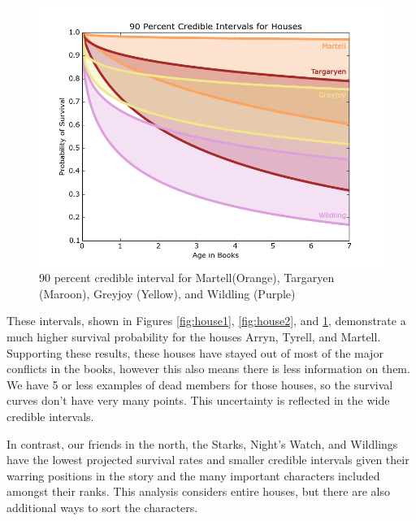 \documentclass{article}
\begin{document}
\begin{figure}[ht!]
\centering
\includegraphics[width=4.8in]{Houses3.png}
\caption{90 percent credible interval for Martell(Orange), Targaryen (Maroon), Greyjoy (Yellow), and Wildling (Purple)}
\label{fig:house3}
\end{figure}

\newpage

These intervals, shown in Figures \ref{fig:house1}, \ref{fig:house2}, and \ref{fig:house3}, demonstrate a much higher survival probability for the houses Arryn, Tyrell, and Martell. Supporting these results, these houses have stayed out of most of the major conflicts in the books, however this also means there is less information on them.  We have 5 or less examples of dead members for those houses, so the survival curves don't have very many points.  This uncertainty is reflected in the wide credible intervals.

In contrast, our friends in the north, the Starks, Night's Watch, and Wildlings have the lowest projected survival rates and smaller credible intervals given their warring positions in the story and the many important characters included amongst their ranks.  This analysis considers entire houses, but there are also additional ways to sort the characters.
\end{document}
